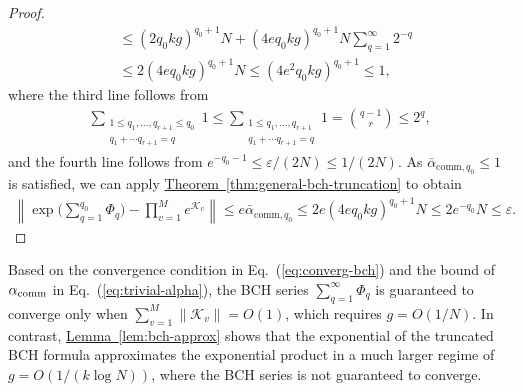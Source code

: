 \documentclass[aps,pra,reprint,groupedaddress,floatfix]{revtex4-2}
\newcommand{\eq}[1]{(\ref{eq:#1})}
\newcommand{\thm}[1]{\hyperref[thm:#1]{Theorem~\ref*{thm:#1}}}
\newcommand{\lem}[1]{\hyperref[lem:#1]{Lemma~\ref*{lem:#1}}}
\renewcommand{\comm}{\mathrm{comm}}
\newcommand{\eps}{\varepsilon}
\newcommand{\mc}{\mathcal}
\begin{document}
\begin{proof}
\begin{align*}
    &\le (2q_0kg)^{q_0+1} N + (4eq_0 kg)^{q_0+1} N \sum_{q = 1}^{\infty} 2^{-q} \\
    &\le 2(4eq_0kg)^{q_0+1}N \le (4e^2q_0 kg)^{q_0+1}\le 1,
    \end{align*}
where the third line follows from 
\begin{align*}
    \sum_{\substack{1\le q_1, \ldots, q_{r+1}\le q_0\\q_1+\cdots q_{r+1}=q}}1\le  \sum_{\substack{1\le q_1, \ldots, q_{r+1}\\q_1+\cdots q_{r+1}=q}}1=\binom{q-1}{r}\le 2^q,
\end{align*}
and the fourth line follows from $e^{-q_0-1} \le \eps/(2N) \le 1/(2N)$.
    As $\bar{\alpha}_{\comm,q_0}\le 1$ is satisfied, we can apply \thm{general-bch-truncation} to obtain 
    \begin{align*}
    \left\|\exp\Big(\sum_{q=1}^{q_0} \Phi_q\Big) - \prod_{v = 1}^Me^{\mc K_v} \right\|
    \le  e\bar{\alpha}_{\comm,q_0}
    \le 2e(4eq_0kg)^{q_0+1}N\le 2e^{-q_0}N\le \eps.
    \end{align*}
\end{proof}
Based on the convergence condition in Eq.~\eq{converg-bch} and the bound of $\alpha_{\rm comm}$ in Eq.~\eq{trivial-alpha}, the BCH series $\sum_{q=1}^{\infty} \Phi_q$ is guaranteed to converge only when $\sum_{v=1}^M \|\mc K_v\| = O(1)$, which requires $g = O(1/N)$. In contrast, \lem{bch-approx}  shows that the exponential of the truncated BCH formula approximates the exponential product in a much larger regime of $g = O(1/(k\log N))$, where the BCH series is not guaranteed to converge. 
\end{document}
